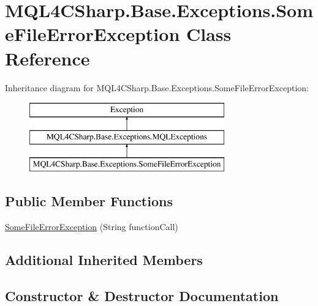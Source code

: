 \hypertarget{class_m_q_l4_c_sharp_1_1_base_1_1_exceptions_1_1_some_file_error_exception}{}\section{M\+Q\+L4\+C\+Sharp.\+Base.\+Exceptions.\+Some\+File\+Error\+Exception Class Reference}
\label{class_m_q_l4_c_sharp_1_1_base_1_1_exceptions_1_1_some_file_error_exception}
Inheritance diagram for M\+Q\+L4\+C\+Sharp.\+Base.\+Exceptions.\+Some\+File\+Error\+Exception\+:\begin{figure}[H]
\begin{center}
\leavevmode
\includegraphics[height=3.000000cm]{class_m_q_l4_c_sharp_1_1_base_1_1_exceptions_1_1_some_file_error_exception}
\end{center}
\end{figure}
\subsection*{Public Member Functions}
\begin{DoxyCompactItemize}
\item 
\hyperlink{class_m_q_l4_c_sharp_1_1_base_1_1_exceptions_1_1_some_file_error_exception_aca0e3d011be378b97d63545f8e45cdb9}{Some\+File\+Error\+Exception} (String function\+Call)
\end{DoxyCompactItemize}
\subsection*{Additional Inherited Members}


\subsection{Constructor \& Destructor Documentation}
